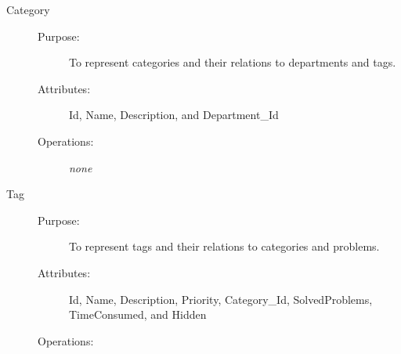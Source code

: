 \begin{description}
\item[Category]\hfill
\begin{description}
	\item[Purpose:]To represent categories and their relations to departments and tags.
	\item[Attributes:]Id, Name, Description, and Department\_Id
	\item[Operations:]\textit{none}
\end{description}
\end{description}

\begin{description}
\item[Tag]\hfill
\begin{description}
	\item[Purpose:]To represent tags and their relations to categories and problems. 
	\item[Attributes:]Id, Name, Description, Priority, Category\_Id, SolvedProblems, TimeConsumed, and Hidden
	\item[Operations:]
\end{description}
\end{description}


